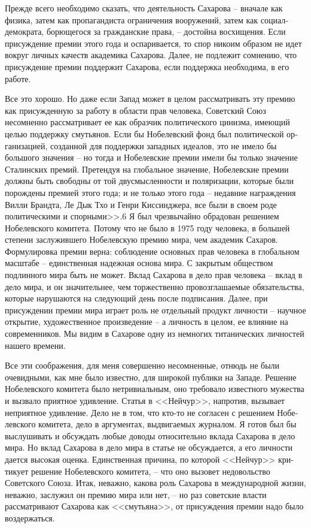 \documentclass{book}
\begin{document}
Прежде всего необходимо сказать, что деятельность Сахарова -- вначале как физика, затем как пропагандиста ограничения вооружений, затем как социал-демократа, борющегося за гражданские права, -- достойна восхищения. Ес­ли присуждение премии этого года и оспаривается, то спор ни­коим образом не идет вокруг личных качеств академика Са­харова. Далее, не подлежит сомнению, что присуждение пре­мии поддержит Сахарова, если поддержка необходима, в его работе.

Все это хорошо. Но даже если Запад может в целом рассмат­ривать эту премию как присужденную за работу в области прав человека, Советский Союз несомненно рассматривает ее как образчик политического цинизма, имеющий целью поддержку смутьянов. Если бы Нобелевский фонд был политической ор­ганизацией, созданной для поддержки западных идеалов, это не имело бы большого значения -- но тогда и Нобелевские премии имели бы только значение Сталинских премий. Пре­тендуя на глобальное значение, Нобелевские премии должны быть свободны от той двусмысленности и поляризации, кото­рые были порождены премией этого года; и не только этого года -- недавние награждения Вилли Брандта, Ле Дык Тхо и Генри Киссинджера, все были в своем роде политическими и спорными>>.6
Я был чрезвычайно обрадован решением Нобелевского комитета. Потому что не было в 1975 году человека, в большей степени заслужившего Нобелевскую премию мира, чем акаде­мик Сахаров. Формулировка премии верна: соблюдение основ­ных прав человека в глобальном масштабе -- единственная на­дежная основа мира. С закрытым обществом подлинного мира быть не может. Вклад Сахарова в дело прав человека -- вклад в дело мира, и он значительнее, чем торжественно провозгла­шаемые обязательства, которые нарушаются на следующий день после подписания. Далее, при присуждении премии мира играет роль не отдельный продукт личности -- научное открытие, художественное произведение -- а личность в целом, ее влияние на современников. Мы видим в Сахарове одну из немногих титанических личностей нашего времени.

Все эти соображения, для меня совершенно несомненные, отнюдь не были очевидными, как мне было известно, для широ­кой публики на Западе. Решение Нобелевского комитета было нетривиальным, оно требовало известного мужества и вызвало приятное удивление.
Статья в <<Нейчур>>, напротив, вызывает неприятное удив­ление. Дело не в том, что кто-то не согласен с решением Нобе­левского комитета, дело в аргументах, выдвигаемых журналом. Я готов был бы выслушивать и обсуждать любые доводы отно­сительно вклада Сахарова в дело мира. Но вклад Сахарова в дело мира в статье не обсуждается, а его личности дается высо­кая оценка. Единственная причина, по которой <<Нейчур>> кри­тикует решение Нобелевского комитета, -- что оно вызовет недовольство Советского Союза. Итак, неважно, какова роль Сахарова в международной жизни, неважно, заслужил он пре­мию мира или нет, -- но раз советские власти рассматривают Сахарова как <<смутьяна>>, от присуждения премии надо было воздержаться.
\end{document}
